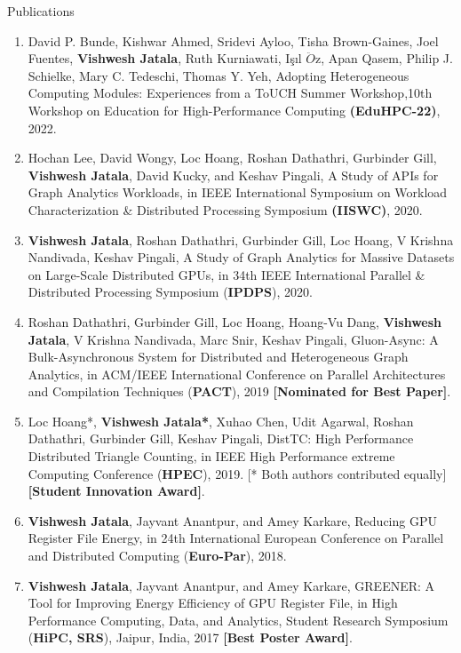 \documentclass{resume} %
\begin{document}
\begin{rSection}{Publications}
\begin{enumerate}
\item David P. Bunde, Kishwar Ahmed, Sridevi Ayloo, Tisha Brown-Gaines, Joel Fuentes, \textbf{Vishwesh Jatala}, Ruth Kurniawati, I\c{s}ıl $\ddot{O}$z, Apan Qasem, Philip J. Schielke, Mary C. Tedeschi, Thomas Y. Yeh, Adopting Heterogeneous Computing Modules: Experiences from a ToUCH Summer Workshop,10th Workshop on Education for High-Performance Computing \textbf{(EduHPC-22)}, 2022. \newline [Accepted]
\item Hochan Lee, David Wongy, Loc Hoang, Roshan Dathathri, Gurbinder Gill, \textbf{Vishwesh Jatala}, David Kucky, and Keshav Pingali, A Study of APIs for Graph Analytics Workloads, in IEEE International Symposium on Workload Characterization \& Distributed Processing Symposium \textbf{(IISWC)}, 2020.
\item \textbf{Vishwesh Jatala}, Roshan Dathathri, Gurbinder Gill, Loc Hoang, V Krishna Nandivada, Keshav Pingali, A Study of Graph Analytics for Massive Datasets on Large-Scale Distributed GPUs, in 34th IEEE International Parallel \& Distributed Processing Symposium (\textbf{IPDPS}), 2020. %
\item Roshan Dathathri, Gurbinder Gill, Loc Hoang, Hoang-Vu Dang, \textbf{Vishwesh Jatala}, V Krishna Nandivada, Marc Snir, Keshav Pingali, Gluon-Async: A Bulk-Asynchronous System for Distributed and Heterogeneous Graph Analytics, in ACM/IEEE International Conference on Parallel Architectures and Compilation Techniques (\textbf{PACT}), 2019 \textbf{[Nominated for Best Paper]}.
\item Loc Hoang*, \textbf{Vishwesh Jatala*}, Xuhao Chen, Udit Agarwal, Roshan Dathathri, Gurbinder Gill, Keshav Pingali, DistTC: High Performance Distributed Triangle Counting, in IEEE High Performance extreme Computing Conference (\textbf{HPEC}), 2019.  [* Both authors contributed equally] \textbf{[Student Innovation Award]}.
\item \textbf{Vishwesh Jatala}, Jayvant Anantpur, and Amey Karkare, Reducing GPU Register File Energy, in 24th International European Conference on Parallel and Distributed Computing (\textbf{Euro-Par}), 2018. 
\item \textbf{Vishwesh Jatala}, Jayvant Anantpur, and Amey Karkare, GREENER: A Tool for Improving Energy Efficiency of GPU Register File, in High Performance Computing, Data, and Analytics, Student Research Symposium (\textbf{HiPC, SRS}), Jaipur, India, 2017 \textbf{[Best Poster Award]}. 

\end{enumerate}
\end{rSection}
\end{document}
